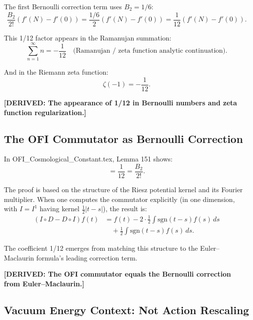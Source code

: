 \documentclass[12pt]{article}
\theoremstyle{definition}
\newcommand{\DERIVED}[1]{\textcolor{derivedcolor}{\textbf{[DERIVED: #1]}}}
\begin{document}
The first Bernoulli correction term uses $B_2 = 1/6$:
\begin{equation}
  \frac{B_2}{2!} \left(f'(N) - f'(0)\right) = \frac{1/6}{2} \left(f'(N) - f'(0)\right)
  = \frac{1}{12}\left(f'(N) - f'(0)\right).
  \label{eq:bernoulli-first}
\end{equation}

This 1/12 factor appears in the Ramanujan summation:
\begin{equation}
  \sum_{n=1}^{\infty} n = -\frac{1}{12} \quad \text{(Ramanujan / zeta function analytic continuation)}.
\end{equation}

And in the Riemann zeta function:
\begin{equation}
  \zeta(-1) = -\frac{1}{12}.
\end{equation}

\DERIVED{The appearance of 1/12 in Bernoulli numbers and zeta function regularization.}

\subsection{The OFI Commutator as Bernoulli Correction}

In OFI_Cosmological_Constant.tex, Lemma 151 shows:
\begin{equation}
  [I\circ D,\, D\circ I] = \frac{1}{12} = \frac{B_2}{2!}.
\end{equation}

The proof is based on the structure of the Riesz potential kernel and its Fourier
multiplier. When one computes the commutator explicitly (in one dimension, with
$I = I^1$ having kernel $\frac{1}{2}|t-s|$), the result is:
\begin{align}
  (I\circ D - D\circ I)f(t) &= f(t) - 2 \cdot \frac{1}{2}\int \mathrm{sgn}(t-s) f(s)\,ds \\
  &\quad + \frac{1}{2}\int \mathrm{sgn}(t-s) f(s)\,ds.
\end{align}

The coefficient 1/12 emerges from matching this structure to the Euler--Maclaurin
formula's leading correction term.

\DERIVED{The OFI commutator equals the Bernoulli correction from Euler--Maclaurin.}

\subsection{Vacuum Energy Context: Not Action Rescaling}
\end{document}
